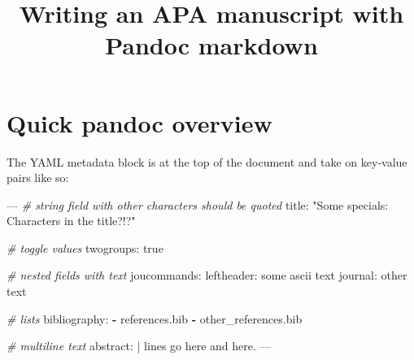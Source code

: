 \documentclass[man,longtable,noextraspace,floatsintext]{apa6}
\title{Writing an APA manuscript with Pandoc markdown}
\newenvironment{Shaded}{}{}
\newcommand{\AttributeTok}[1]{\textcolor[rgb]{0.49,0.56,0.16}{#1}}
\newcommand{\CommentTok}[1]{\textcolor[rgb]{0.38,0.63,0.69}{\textit{#1}}}
\newcommand{\FunctionTok}[1]{\textcolor[rgb]{0.02,0.16,0.49}{#1}}
\newcommand{\KeywordTok}[1]{\textcolor[rgb]{0.00,0.44,0.13}{\textbf{#1}}}
\newcommand{\NormalTok}[1]{#1}
\newcommand{\OtherTok}[1]{\textcolor[rgb]{0.00,0.44,0.13}{#1}}
\newcommand{\StringTok}[1]{\textcolor[rgb]{0.25,0.44,0.63}{#1}}
\begin{document}
\maketitle

\makeatletter
\def\LT@makenoprefixcaption#1#2#3{%
  \LT@mcol\LT@cols c{\hbox to\z@{\hss\parbox[t]\LTcapwidth{
    \sbox\@tempboxa{#1{}#3}
    \ifdim\wd\@tempboxa>\hsize
      #1{}#3
    \else
      \hbox to\hsize{\hfil\box\@tempboxa\hfil}%
    \fi
    \endgraf\vskip\baselineskip}
  \hss}}}
\makeatother

\makeatletter
\let\LT@oldmakecaption=\LT@makecaption
\let\oldthetable=\thetable
\let\oldtheHtable=\theHtable
\makeatother

\makeatletter
{}
\newenvironment{no-prefix-table-caption}{
  \let\LT@makecaption=\LT@makenoprefixcaption
  \renewcommand\thetable{x.\thetableno}
  \renewcommand\theHtable{x.\thetableno}
  \stepcounter{tableno}
}{
  \let\thetable=\oldthetable
  \let\theHtable=\oldtheHtable
  \let\LT@makecaption=\LT@oldmakecaption
  \addtocounter{table}{-1}
}
\makeatother

\hypertarget{quick-pandoc-overview}{%
\section{Quick pandoc overview}\label{quick-pandoc-overview}}

The YAML metadata block is at the top of the document and take on
key-value pairs like so:

\begin{Shaded}
\begin{Highlighting}[]
\OtherTok{---}
\CommentTok{# string field with other characters should be quoted}
\FunctionTok{title:}\AttributeTok{ }\StringTok{"Some specials: Characters in the title?!?"}

\CommentTok{# toggle values}
\FunctionTok{twogroups:}\AttributeTok{ true}

\CommentTok{# nested fields with text}
\FunctionTok{joucommands:}
    \FunctionTok{leftheader:}\AttributeTok{ some ascii text}
    \FunctionTok{journal:}\AttributeTok{ other text}

\CommentTok{# lists}
\FunctionTok{bibliography:}
    \KeywordTok{-}\NormalTok{ references.bib}
    \KeywordTok{-}\NormalTok{ other_references.bib}

\CommentTok{# multiline text}
\FunctionTok{abstract:}\AttributeTok{ |}
\NormalTok{    lines go here}
\NormalTok{    and here.}
\OtherTok{---}
\end{Highlighting}
\end{Shaded}
\end{document}
